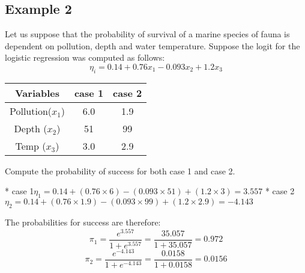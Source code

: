 \subsection{Example 2}
Let us suppose that the probability of survival of a marine species of fauna is dependent on pollution, depth and water temperature. Suppose the logit for the logistic regression was computed as follows:
\[ \eta_i = 0.14 + 0.76x_1 - 0.093x_2 + 1.2x_3  \]
\begin{center}
\begin{tabular}{|c|c|c|}
  \hline
Variables & case 1 & case 2 \\ \hline
Pollution($x_1$) & 6.0 & 1.9 \\
Depth ($x_2$)& 51 & 99 \\
Temp ($x_3$) & 3.0 & 2.9 \\
  \hline
\end{tabular}
\end{center}
Compute the probability of success for both case 1 and case 2.


*  case 1$ \eta_1 = 0.14 + (0.76 \times 6)	- (0.093\times 51) + (1.2\times 3) = 3.557$
*  case 2$ \eta_2 = 0.14 + (0.76 \times 1.9)	- (0.093\times 99) + (1.2\times 2.9) = -4.143$


The probabilities for success are therefore:
\[ \pi_1  =  \frac{e^{3.557}}{1 + e^{3.557}} = \frac{35.057}{1 + 35.057} = 0.972 \]
\[ \pi_2  =  \frac{e^{-4.143}}{1 + e^{-4.143}} = \frac{0.0158}{1 + 0.0158} = 0.0156 \]

